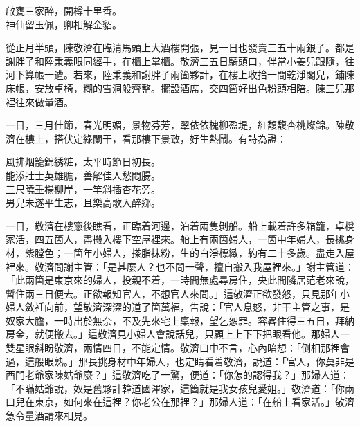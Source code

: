 \begin{myquote}
啟甕三家醉，開樽十里香。\\神仙留玉佩，卿相解金貂。
\end{myquote}

從正月半頭，陳敬濟在臨清馬頭上大酒樓開張，見一日也發賣三五十兩銀子。都是謝胖子和陸秉義眼同經手，在櫃上掌櫃。敬濟三五日騎頭口，伴當小姜兒跟隨，往河下算帳一遭。若來，陸秉義和謝胖子兩箇夥計，在樓上收拾一間乾淨閣兒，鋪陳床帳，安放卓椅，糊的雪洞般齊整。擺設酒席，交四箇好出色粉頭相陪。陳三兒那裡往來做量酒。

一日，三月佳節，春光明媚，景物芬芳，翠依依槐柳盈堤，紅馥馥杏桃燦錦。陳敬濟在樓上，搭伏定綠闌干，看那樓下景致，好生熱鬧。有詩為證：

\begin{myquote}
風拂烟籠錦綉粧，太平時節日初長。\\能添壯士英雄膽，善解佳人愁悶腸。\\三尺曉垂楊柳岸，一竿斜插杏花旁。\\男兒未遂平生志，且樂高歌入醉鄉。
\end{myquote}

一日，敬濟在樓窻後瞧看，正臨着河邊，泊着兩隻剝船。船上載着許多箱籠，卓櫈家活，四五箇人，盡搬入樓下空屋裡來。船上有兩箇婦人，{}一箇中年婦人，長挑身材，紫膛色；一箇年小婦人，搽脂抹粉，生的白淨標緻，約有二十多歲。盡走入屋裡來。{}敬濟問謝主管：「是甚麼人？也不問一聲，擅自搬入我屋裡來。」謝主管道：「此兩箇是東京來的婦人，投親不着，一時間無處尋房住，央此間隣居范老來說，暫住兩三日便去。正欲報知官人，不想官人來問。」這敬濟正欲發怒，只見那年小婦人斂衽向前，望敬濟深深的道了箇萬福，告說：「官人息怒，非干主管之事，是奴家大膽，一時出於無奈，不及先來宅上稟報，望乞恕罪。容畧住得三五日，拜納房金，就便搬去。」這敬濟見小婦人會說話兒，只顧上上下下把眼看他。那婦人一雙星眼斜盼敬濟，兩情四目，不能定情。{}敬濟口中不言，心內暗想：「倒相那裡會過，這般眼熟。」那長挑身材中年婦人，也定睛看着敬濟，說道：「官人，你莫非是西門老爺家陳姑爺麼？」這敬濟吃了一驚，便道：「你怎的認得我？」那婦人道：「不瞞姑爺說，奴是舊夥計韓道國渾家，這箇就是我女孩兒愛姐。」敬濟道：「你兩口兒在東京，如何來在這裡？你老公在那裡？」{}那婦人道：「在船上看家活。」敬濟急令量酒請來相見。

